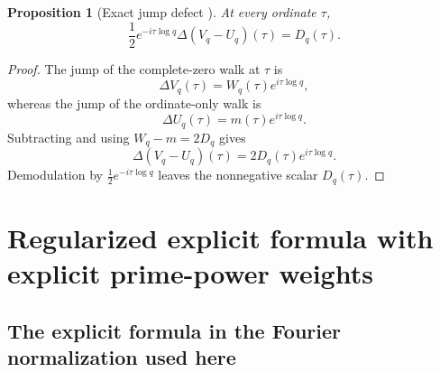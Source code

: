 \documentclass[11pt]{amsart}
\numberwithin{equation}{section}
\theoremstyle{plain}
\newtheorem{proposition}[theorem]{Proposition}
\theoremstyle{definition}
\theoremstyle{remark}
\newcommand{\1}{\mathbf{1}}
\begin{document}
\begin{proposition}[Exact jump defect {}]
\label{prop:jump_defect}
At every ordinate $\tau$,
\begin{equation}
\boxed{
\frac12e^{-i\tau\log q}
\Delta(V_q-U_q)(\tau)
=
D_q(\tau).
}
\label{eq:jump_defect}
\end{equation}
\end{proposition}

\begin{proof}
The jump of the complete-zero walk at \(\tau\) is
\begin{equation}
\Delta V_q(\tau)
=
W_q(\tau)e^{i\tau\log q},
\label{eq:jump_complete_walk}
\end{equation}
whereas the jump of the ordinate-only walk is
\begin{equation}
\Delta U_q(\tau)
=
m(\tau)e^{i\tau\log q}.
\label{eq:jump_ordinate_walk}
\end{equation}
Subtracting and using \(W_q-m=2D_q\) gives
\begin{equation}
\Delta(V_q-U_q)(\tau)
=
2D_q(\tau)e^{i\tau\log q}.
\label{eq:jump_difference_detailed}
\end{equation}
Demodulation by \(\frac12e^{-i\tau\log q}\) leaves the nonnegative scalar
\(D_q(\tau)\).
\end{proof}

\section{Regularized explicit formula with explicit prime-power weights}
\label{sec:regularized_explicit_formula_detailed}

\subsection{The explicit formula in the Fourier normalization used here}
\label{subsec:guinand_weil_normalization}
\end{document}
